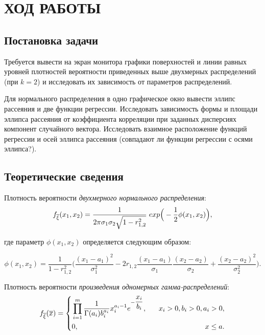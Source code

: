 \section{ХОД РАБОТЫ}

\subsection{Постановка задачи}

Требуется вывести на экран монитора графики поверхностей и линии равных
уровней плотностей вероятности приведенных выше двухмерных распределений
(при $ k = 2 $) и исследовать их зависимость от параметров распределений.

Для нормального распределения в одно графическое окно вывести эллипс
рассеяния и две функции регрессии. Исследовать зависимость формы и
площади эллипса рассеяния от коэффициента корреляции при заданных дисперсиях
компонент случайного вектора. Исследовать взаимное расположение
функций регрессии и осей эллипса рассеяния (совпадают ли функции регрессии
с осями эллипса?).

\subsection{Теоретические сведения}

Плотность вероятности \textit{двухмерного нормального распределения}:
\begin{equation}
    f_{\overline{\xi}}(x_1, x_2) =
    \dfrac{1}{2 \pi \sigma_1 \sigma_2 \sqrt{1-r_{1,2}^2}} \hspace{1mm} exp \Big(-\dfrac{1}{2}\phi(x_1, x_2) \Big),
\end{equation}

\noindent где параметр $ \phi(x_1, x_2) $ определяется следующим образом: 

\begin{equation*}
    \phi(x_1, x_2) = \dfrac{1}{1-r_{1,2}^2}
    \Bigg(
    \dfrac{(x_1 - a_1)^2}{\sigma_1^2} - 
    2r_{1,2} \dfrac{(x_1 - a_1)}{\sigma_1} \dfrac{(x_2 - a_2)}{\sigma_2} +
    \dfrac{(x_2 - a_2)^2}{\sigma_2^2} 
    \Bigg).
\end{equation*}

Плотность вероятности \textit{произведения одномерных гамма-распределений}:
\begin{equation}
    \begin{aligned}
      f_{\overline{\xi}}(\overline{x}) =
      \left\{
        \begin{aligned}
          &\prod_{i=1}^m \dfrac{1}{\Gamma(a_i)b_i^{a_i}} x_i^{a_i-1} e^{-\dfrac{x_i}{b_i}}, \hspace{3mm} &x_i > 0, b_i > 0, a_i > 0, \\
          &0, \hspace{11.5mm} &x \le a.
        \end{aligned}
      \right.
    \end{aligned}
  \end{equation}

